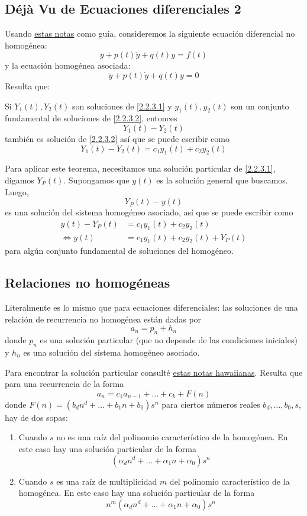 \documentclass[spanish]{book}
\theoremstyle{definition}
\begin{document}
\subsection{Déjà Vu de Ecuaciones diferenciales 2}
Usando \href{https://tutorial.math.lamar.edu/Classes/DE/NonhomogeneousDE.aspx#mjx-eqn-eqeq1}{estas notas} como guía, consideremos la siguiente ecuación diferencial no homogénea:
\begin{equation}\label{2.2.3.1}
	\ddot{y}+p(t)\dot{y}+q(t)y=f(t)
\end{equation}
y la ecuación homogénea asociada:
\begin{equation}\label{2.2.3.2}
	\ddot{y}+p(t)\dot{y}+q(t)y=0
\end{equation}
Resulta que:
\begin{teo}
	Si $Y_1(t), Y_2(t)$ son soluciones de \eqref{2.2.3.1} y $y_1(t),y_2(t)$ son un conjunto fundamental de soluciones de \eqref{2.2.3.2}, entonces
	\[Y_1(t)-Y_2(t)\]
	también es solución de \eqref{2.2.3.2} así que se puede escribir como
	\[Y_1(t)-Y_2(t)=c_1y_1(t)+c_2y_2(t)\]
\end{teo}
	Para aplicar este teorema, necesitamos una solución particular de \eqref{2.2.3.1}, digamos $Y_P(t)$. Supongamos que $y(t)$ es la solución general que buscamos. Luego,
	\[Y_P(t)-y(t)\]
	es una solución del sistema homogéneo asociado, así que se puede escribir como 
	\begin{align*}
		y(t)-Y_P(t)&=c_1y_1(t)+c_2y_2(t)\\
	\iff y(t)&=c_1y_1(t)+c_2y_2(t)+Y_P(t)
	\end{align*}
	para algún conjunto fundamental de soluciones del homogéneo.
\fi
\subsection{Relaciones no homogéneas}
	Literalmente es lo mismo que para ecuaciones diferenciales: las soluciones de una relación de recurrencia no homogénea están dadas por
	\[a_n=p_n+h_n\]
	donde $p_n$ es una solución particular (que no depende de las condiciones iniciales) y $h_n$ es una solución del sistema homogéneo asociado.
	
	Para encontrar la solución particular consulté \href{https://courses.ics.hawaii.edu/ReviewICS241/morea/counting/RecurrenceRelations2-QA.pdf}{estas notas hawaiianas}. Resulta que para una recurrencia de la forma
	\[a_n=c_1a_{n-1}+\ldots+c_k+F(n)\]
	donde $F(n)=(b_dn^d+\ldots+b_1n+b_0)s^n$ para ciertos números reales $b_d,\ldots,b_0,s$, hay de dos sopas:
	\begin{enumerate}
		\item Cuando $s$ no es una raíz del polinomio característico de la homogénea. En este caso hay una solución particular de la forma
		\[(\alpha_dn^d+\ldots+\alpha_1n+\alpha_0)s^n\]
		
		\item Cuando $s$ es una raíz de multiplicidad $m$ del polinomio característico de la homogénea. En este caso hay una solución particular de la forma
		\[n^m(\alpha_dn^d+\ldots+\alpha_1n+\alpha_0)s^n\]
		
	\end{enumerate}
	
\end{document}
